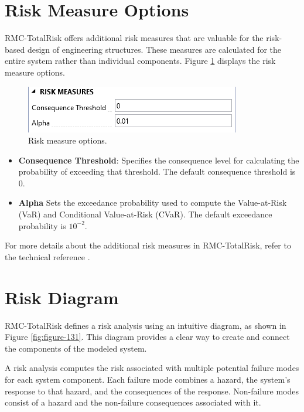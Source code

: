 \documentclass[
]{book}
\begin{document}
\hypertarget{risk-measure-options}{%
\section{Risk Measure Options}\label{risk-measure-options}}

RMC-TotalRisk offers additional risk measures that are valuable for the risk-based design of engineering structures. These measures are calculated for the entire system rather than individual components. Figure \ref{fig:figure-130} displays the risk measure options.

\begin{figure}

{\centering \includegraphics{images/figure130} 

}

\caption{Risk measure options.}\label{fig:figure-130}
\end{figure}

\begin{itemize}
\item
  \textbf{Consequence Threshold}: Specifies the consequence level for calculating the probability of exceeding that threshold. The default consequence threshold is \(0\).
\item
  \textbf{Alpha} Sets the exceedance probability used to compute the Value-at-Risk (VaR) and Conditional Value-at-Risk (CVaR). The default exceedance probability is \(10^{−2}\).
\end{itemize}

For more details about the additional risk measures in RMC-TotalRisk, refer to the technical reference \citep{cite-TechRef}.

\hypertarget{risk-diagram}{%
\section{Risk Diagram}\label{risk-diagram}}

RMC-TotalRisk defines a risk analysis using an intuitive diagram, as shown in Figure \ref{fig:figure-131}. This diagram provides a clear way to create and connect the components of the modeled system.

A risk analysis computes the risk associated with multiple potential failure modes for each system component. Each failure mode combines a hazard, the system's response to that hazard, and the consequences of the response. Non-failure modes consist of a hazard and the non-failure consequences associated with it.
\end{document}
